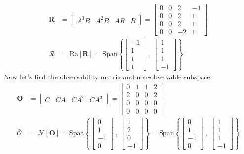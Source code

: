 \documentclass[twoside]{article}
\begin{document}
\begin{align*}
    \mathbf{R} &= \left[ \begin{array}{c|c|c|c} A^3 B & A^2 B & A B & B \end{array} \right] 
    =
    \left[ \begin{array}{cccc} 0 & 0 & 2 & -1 \\ 
    0 & 0 & 2 & 1 \\ 
    0 & 0 & 2 & 1 \\ 
    0 & 0 & -2 & 1 
    \end{array} \right] 
    \\
    \mathcal{R} &= \mathrm{Ra}[ \mathbf{R} ] = \mathrm{Span} \left\lbrace 
    \left[ \begin{array}{c} -1 \\  1 \\  1 \\  1  \end{array} \right] 
    \ , \
    \left[ \begin{array}{c} 1 \\  1 \\  1 \\  -1  \end{array} \right] 
    \right\rbrace
\end{align*}
%
Now let's find the observability matrix and non-observable subspace
%
%
\begin{align*}
    \mathbf{O} &= \left[ \begin{array}{cccc} C & C A & C A^2 & C A^3 \end{array} \right] 
    =
    \left[ \begin{array}{cccc} 0 & 1 & 1 & 2 \\ 
    2 & 0 & 0 & 2 \\ 
    0 & 0 & 0 & 0 \\ 
    0 & 0 & 0 & 0 
    \end{array} \right] 
    \\
    \bar{\mathcal{O}} &= \mathcal{N}[ \mathbf{O} ] = \mathrm{Span} \left\lbrace 
    \left[ \begin{array}{c} 0 \\  1 \\  -1 \\  0  \end{array} \right] 
    \ , \
    \left[ \begin{array}{c} 1 \\  2 \\  0 \\  -1  \end{array} \right] 
    \right\rbrace = \mathrm{Span} \left\lbrace 
    \left[ \begin{array}{c} 0 \\  1 \\  -1 \\  0  \end{array} \right] 
    \ , \
    \left[ \begin{array}{c} 1 \\  1 \\  1 \\  -1  \end{array} \right] \right\rbrace 
\end{align*}
\end{document}
